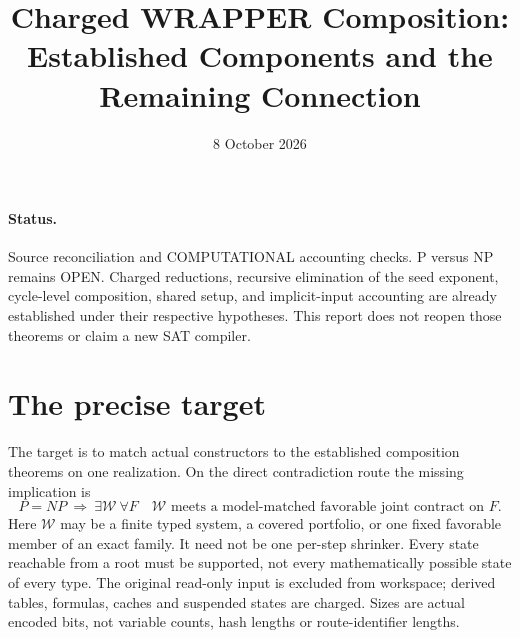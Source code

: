 \documentclass[11pt]{article}
\title{Charged WRAPPER Composition: Established Components and the Remaining Connection}
\date{8 October 2026}
\begin{document}
\maketitle
\paragraph{Status.} Source reconciliation and COMPUTATIONAL accounting checks.
P versus NP remains OPEN. Charged reductions, recursive elimination of the
seed exponent, cycle-level composition, shared setup, and implicit-input
accounting are already established under their respective hypotheses.
This report does not reopen those theorems or claim a new SAT compiler.

\section{The precise target}
The target is to match actual constructors to the established composition
theorems on one realization. On the direct contradiction route the missing
implication is
\[
 P=NP\ \Longrightarrow\ \exists\mathcal W\ \forall F\quad
 \mathcal W\text{ meets a model-matched favorable joint contract on }F.
\]
Here $\mathcal W$ may be a finite typed system, a covered portfolio, or one
fixed favorable member of an exact family. It need not be one per-step
shrinker. Every state reachable from a root must be supported, not every
mathematically possible state of every type. The original read-only input
is excluded from workspace; derived tables, formulas, caches and suspended
states are charged. Sizes are actual encoded bits, not variable counts,
hash lengths or route-identifier lengths.
\end{document}
